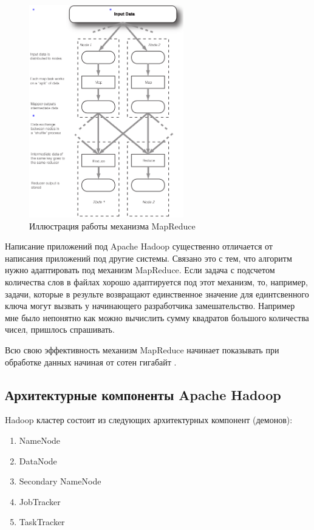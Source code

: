 \documentclass[a4paper,11pt]{article}
\begin{document}
\begin{figure}[h!]
  \centering
  \includegraphics[height=350px]{res/mapreduce.png}
  \caption{Иллюстрация работы механизма MapReduce}
  \label{fig:mapreduce}
\end{figure}

Написание приложений под Apache Hadoop существенно отличается от написания приложений под другие системы. Связано это
с тем, что алгоритм нужно адаптировать под механизм MapReduce. Если задача с подсчетом количества слов в файлах хорошо
адаптируется под этот механизм, то, например, задачи, которые в результе возвращают единственное значение для
единтсвенного ключа могут вызвать у начинающего разработчика замешательство. Например мне было непонятно как можно
вычислить сумму квадратов большого количества чисел, пришлось спрашивать\cite{sum_of_squares}.

Всю свою эффективность механизм MapReduce начинает показывать при обработке данных начиная от сотен гигабайт
\cite[p.~6]{oreilly}.

\subsection{Архитектурные компоненты Apache Hadoop}
Hadoop кластер состоит из следующих архитектурных компонент (демонов):
\begin{enumerate}
  \item NameNode
  \item DataNode
  \item Secondary NameNode
  \item JobTracker
  \item TaskTracker
\end{enumerate}
\end{document}
